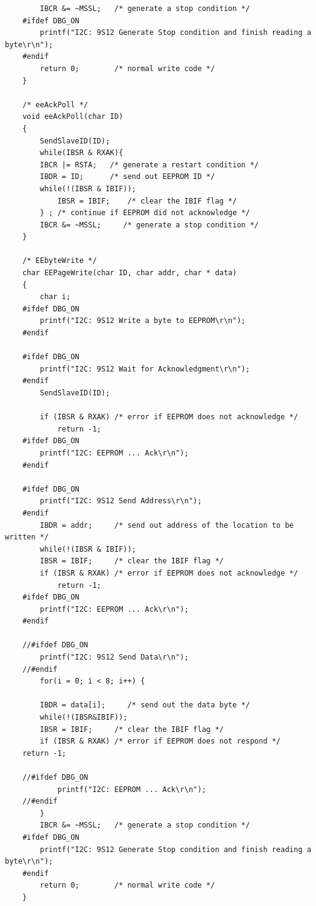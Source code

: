 \documentclass{article}
\begin{document}
\begin{lstlisting}
		IBCR &= ~MSSL;   /* generate a stop condition */
	#ifdef DBG_ON
		printf("I2C: 9S12 Generate Stop condition and finish reading a byte\r\n");
	#endif
		return 0;        /* normal write code */
	}
	
	/* eeAckPoll */
	void eeAckPoll(char ID)
	{
		SendSlaveID(ID);
		while(IBSR & RXAK){
		IBCR |= RSTA;   /* generate a restart condition */
		IBDR = ID;      /* send out EEPROM ID */
		while(!(IBSR & IBIF));
			IBSR = IBIF;    /* clear the IBIF flag */
		} ; /* continue if EEPROM did not acknowledge */
		IBCR &= ~MSSL;     /* generate a stop condition */
	}
	
	/* EEbyteWrite */
	char EEPageWrite(char ID, char addr, char * data)
	{
		char i;
	#ifdef DBG_ON
		printf("I2C: 9S12 Write a byte to EEPROM\r\n");
	#endif
	
	#ifdef DBG_ON
		printf("I2C: 9S12 Wait for Acknowledgment\r\n");
	#endif
		SendSlaveID(ID);
	
		if (IBSR & RXAK) /* error if EEPROM does not acknowledge */
			return -1;
	#ifdef DBG_ON
		printf("I2C: EEPROM ... Ack\r\n");
	#endif
	
	#ifdef DBG_ON
		printf("I2C: 9S12 Send Address\r\n");
	#endif
		IBDR = addr;     /* send out address of the location to be written */
		while(!(IBSR & IBIF));
		IBSR = IBIF;     /* clear the IBIF flag */
		if (IBSR & RXAK) /* error if EEPROM does not acknowledge */
			return -1;
	#ifdef DBG_ON
		printf("I2C: EEPROM ... Ack\r\n");
	#endif
	
	//#ifdef DBG_ON
		printf("I2C: 9S12 Send Data\r\n");
	//#endif
		for(i = 0; i < 8; i++) {
	
		IBDR = data[i];     /* send out the data byte */
		while(!(IBSR&IBIF));
		IBSR = IBIF;     /* clear the IBIF flag */
		if (IBSR & RXAK) /* error if EEPROM does not respond */
	return -1;
	
	//#ifdef DBG_ON
			printf("I2C: EEPROM ... Ack\r\n");
	//#endif     
		}
		IBCR &= ~MSSL;   /* generate a stop condition */
	#ifdef DBG_ON
		printf("I2C: 9S12 Generate Stop condition and finish reading a byte\r\n");
	#endif
		return 0;        /* normal write code */
	}
	\end{lstlisting}
\end{document}
